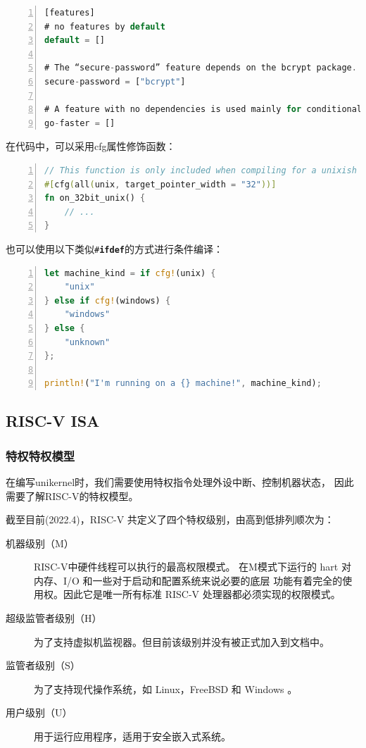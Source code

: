\documentclass{../runikraft-report}
\begin{document}
\begin{lstlisting}[numbers=left,language=Rust]
[features]
# no features by default
default = []

# The “secure-password” feature depends on the bcrypt package.
secure-password = ["bcrypt"]

# A feature with no dependencies is used mainly for conditional compilation, like `#[cfg(feature = "go-faster")]`.
go-faster = []
\end{lstlisting}

在代码中，可以采用cfg属性修饰函数：
\begin{lstlisting}[numbers=left,language=Rust]
// This function is only included when compiling for a unixish OS with a 32-bit architecture
#[cfg(all(unix, target_pointer_width = "32"))]
fn on_32bit_unix() {
	// ...
}
\end{lstlisting}
也可以使用以下类似\texttt{\#\textbf{ifdef}}的方式进行条件编译：
\begin{lstlisting}[numbers=left,language=Rust]
let machine_kind = if cfg!(unix) {
	"unix"
} else if cfg!(windows) {
	"windows"
} else {
	"unknown"
};

println!("I'm running on a {} machine!", machine_kind);
\end{lstlisting}
\cite{e}

\subsection{RISC-V ISA}\vspace*{-4ex}
\subsubsection{特权特权模型}
在编写unikernel时，我们需要使用特权指令处理外设中断、控制机器状态，
因此需要了解RISC-V的特权模型。

截至目前(2022.4)，RISC-V 共定义了四个特权级别，由高到低排列顺次为：

\begin{description}
\item[机器级别（M）] RISC-V中硬件线程可以执行的最高权限模式。
在M模式下运行的 hart 对内存、I/O 和一些对于启动和配置系统来说必要的底层
功能有着完全的使用权。因此它是唯一所有标准 RISC-V 处理器都必须实现的权限模式。\cite{a}
\item[超级监管者级别（H）] 为了支持虚拟机监视器。但目前该级别并没有被正式加入到文档中。
\item[监管者级别（S）] 为了支持现代操作系统，如 Linux，FreeBSD 和 Windows 。
\item[用户级别（U）] 用于运行应用程序，适用于安全嵌入式系统。
\end{description}
\end{document}
